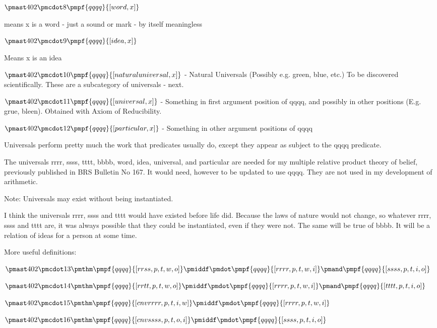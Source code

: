 \documentclass[12pt]{article}
\begin{document}
$\pmast 402 \pmcdot 8 \pmpf{qqqq}{[word, x]}$

means x is a word - just a sound or mark - by itself meaningless

$\pmast 402 \pmcdot 9 \pmpf{qqqq}{[idea, x]}$

Means x is an idea

$\pmast 402 \pmcdot 10 \pmpf{qqqq}{[naturaluniversal, x]}$ - Natural Universals (Possibly e.g. green, blue, etc.) To be discovered scientifically. These are a subcategory of universals - next.

$\pmast 402 \pmcdot 11 \pmpf{qqqq}{[universal, x]}$ - Something in first argument position of qqqq, and possibly in other positions (E.g. grue, bleen). Obtained with Axiom of Reducibility.

$\pmast 402 \pmcdot 12 \pmpf{qqqq}{[particular, x]}$ - Something in other argument positions of qqqq

Universals perform pretty much the work that predicates usually do, except they appear as subject to the qqqq predicate.

The universals rrrr, ssss, tttt, bbbb, word, idea, universal, and particular are needed for my multiple relative product theory of belief, previously published in BRS Bulletin No 167. It would need, however to be updated to use qqqq.
They are not used in my development of arithmetic.

Note: Universals may exist without being instantiated.

I think the universals rrrr, ssss and tttt would have existed before life did. Because the laws of nature would not change, so whatever rrrr, ssss and tttt are, it was always possible that they could be instantiated, even if they were not. The same will be true of bbbb. It will be a relation of ideas for a person at some time.

More useful definitions:

$\pmast 402 \pmcdot 13 \pmthm \pmpf{qqqq}{[rrss, p, t, w, o]} \pmiddf \pmdot \pmpf{qqqq}{[rrrr, p, t, w, i]} \pmand \pmpf{qqqq}{[ssss, p, t, i, o]} $

$\pmast 402 \pmcdot 14 \pmthm \pmpf{qqqq}{[rrtt, p, t, w, o]} \pmiddf \pmdot \pmpf{qqqq}{[rrrr, p, t, w, i]} \pmand \pmpf{qqqq}{[tttt, p, t, i, o]} $

$\pmast 402 \pmcdot 15 \pmthm \pmpf{qqqq}{[cnvrrrr, p, t, i, w]} \pmiddf \pmdot \pmpf{qqqq}{[rrrr, p, t, w, i]} $

$\pmast 402 \pmcdot 16 \pmthm \pmpf{qqqq}{[cnvssss, p, t, o, i]} \pmiddf \pmdot \pmpf{qqqq}{[ssss, p, t, i, o]} $
\end{document}
